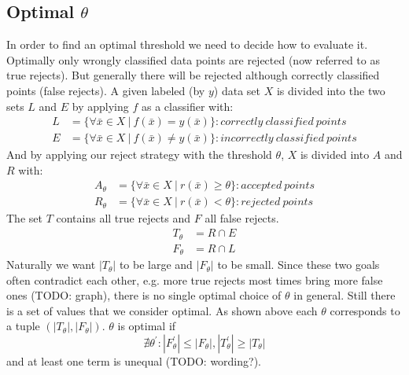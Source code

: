 \subsection{Optimal $\theta$}
\label{optimalt}
In order to find an optimal threshold we need to decide how to evaluate it. Optimally only wrongly classified data points are rejected (now referred to as true rejects). But generally there will be rejected although correctly classified points (false rejects). 
A given labeled (by $y$) data set $X$ is divided into the two sets $L$ and $E$ by applying $f$ as a classifier with:
\begin{align} 
L&=\{\forall \bar{x} \in X \ | \ f(\bar{x}) = y(\bar{x})\} : correctly \ classified \ points \\
E&=\{\forall \bar{x} \in X \ | \ f(\bar{x}) \neq y(\bar{x})\} : incorrectly \ classified \ points \end{align}
And by applying our reject strategy with the threshold $\theta$, $X$ is divided into $A$ and $R$ with:
\begin{align} 
A_\theta&=\{\forall \bar{x} \in X \ | \ r(\bar{x}) \geq \theta \} : accepted \ points \\
R_\theta&=\{\forall \bar{x} \in X \ | \ r(\bar{x}) < \theta\} : rejected \ points 
\end{align}
The set $T$ contains all true rejects and $F$ all false rejects.
\begin{align} 
T_\theta &= R \cap E \\ 
F_\theta &= R \cap L
\end{align}
Naturally we want $|T_\theta|$ to be large and $|F_\theta|$ to be small. Since these two goals often contradict each other, e.g. more true rejects most times bring more false ones (TODO: graph), there is no single optimal choice of $\theta$ in general. Still there is a set of values that we consider optimal. As shown above each $\theta$ corresponds to a tuple $(|T_\theta|,|F_\theta|)$. $\theta$ is optimal if
$$ \nexists \theta^{'} : |F_\theta^{'}|\leq|F_\theta|, |T_\theta^{'}|\geq|T_\theta| $$ and at least one term is unequal (TODO: wording?). 

